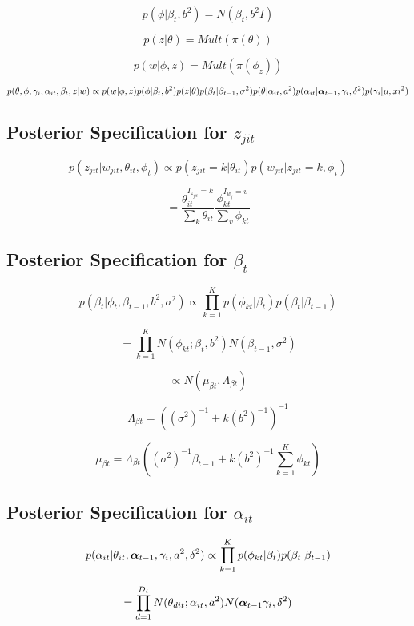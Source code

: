 \documentclass[a4paper]{article}
\begin{document}
\[p(\phi | \beta_t, b^2) = N(\beta_t, b^2I)\]

\[p(z| \theta) = Mult(\pi(\theta))\]

\[p(w | \phi, z) = Mult(\pi(\phi_z))\]

\[p(\theta, \phi, \gamma_i, \alpha_{it}, \beta_t, z | w) \propto p(w | \phi, z) p(\phi |  \beta_t, b^2)  p(z | \theta)  p(\beta_t | \beta_{t-1}, \sigma^2) p(\theta | \alpha_{it}, a^2) p(\alpha_{it} | \text{\boldmath$\alpha$}_{t-1}, \gamma_i, \delta^2) p(\gamma_i | \mu, xi^2)\]

\subsection{Posterior Specification for $z_{jit}$}

\[p(z_{jit} | w_{jit}, \theta_{it}, \phi_t) \propto p(z_{jit} = k | \theta_{it}) p(w_{jit} | z_{jit} = k, \phi_t)\]

\[= \frac{\theta_{it}^{I_{z_{jit}}=k}}{\sum_k \theta_{it}} \frac{\phi_{kt}^{I_{w_j}=v}}{\sum_v \phi_{kt}}\]

\subsection{Posterior Specification for $\beta_t$}

\[p(\beta_t | \phi_t, \beta_{t-1}, b^2, \sigma^2) \propto \prod_{k=1}^K p(\phi_{kt} | \beta_t) p(\beta_t | \beta_{t-1})\]

\[= \prod_{k=1}^K N(\phi_{kt};\beta_t, b^2) N(\beta_{t-1}, \sigma^2)\]

\[\propto N(\mu_{\beta t}, \Lambda_{\beta t})\]

\[\Lambda_{\beta t} = ((\sigma^2)^{-1} + k (b^2)^{-1})^{-1}\]

\[\mu_{\beta t} = \Lambda_{\beta t} \left((\sigma^2)^{-1}\beta_{t-1} + k (b^2)^{-1} \sum_{k=1}^K \phi_{kt}\right) \]

\subsection{Posterior Specification for $\alpha_{it}$}

\[p(\alpha_{it} | \theta_{it}, \text{\boldmath$\alpha$}_{t-1}, \gamma_i, a^2, \delta^2) \propto \prod_{k=1}^K p(\phi_{kt} | \beta_t) p(\beta_t | \beta_{t-1})\]

\[= \prod_{d=1}^{D_i} N(\theta_{dit};\alpha_{it}, a^2) N(\text{\boldmath$\alpha$}_{t-1}\gamma_i, \delta^2)\]
\end{document}
